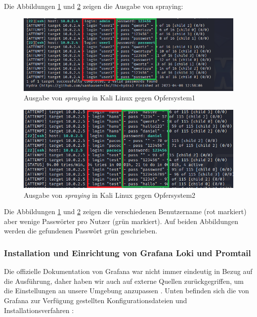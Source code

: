 Die Abbildungen \ref{fig:spraying_opfer1} und \ref{fig:spraying_opfer2} zeigen die Ausgabe von \gls{spraying}:
\begin{figure}[H]
   \centering
   \includegraphics[width=1\textwidth]{assets/Spraying_Kali.png}
   \caption[Ausgabe von \textit{\gls{spraying}} in Kali Linux gegen Opfersystem1]
   {Ausgabe von \textit{\gls{spraying}} in Kali Linux gegen Opfersystem1}
   \label{fig:spraying_opfer1}
   \centering
\end{figure}

\begin{figure}[H]
   \centering
   \includegraphics[width=1\textwidth]{assets/Spraying_Kali2.png}
   \caption[Ausgabe von \textit{\gls{spraying}} in Kali Linux gegen Opfersystem2]
   {Ausgabe von \textit{\gls{spraying}} in Kali Linux gegen Opfersystem2}
   \label{fig:spraying_opfer2}
   \centering
\end{figure}

Die Abbildungen \ref{fig:spraying_opfer1} und \ref{fig:spraying_opfer2} zeigen die verschiedenen Benutzername (rot markiert) aber wenige Passwörter pro Nutzer (grün markiert). Auf beiden Abbildungen werden die gefundenen Passwört grün geschrieben.

\newpage
\subsubsection{Installation und Einrichtung von Grafana Loki und Promtail}
Die offizielle Dokumentation von Grafana war nicht immer eindeutig in Bezug auf die Ausführung, daher haben wir auch auf externe Quellen zurückgegriffen, um die Einstellungen an unsere Umgebung anzupassen \citep{Polinowski_PGL}. Unten befinden sich die von Grafana zur Verfügung gestellten Konfigurationsdateien und Installationsverfahren \citep{GrafanaLoki_run}:

